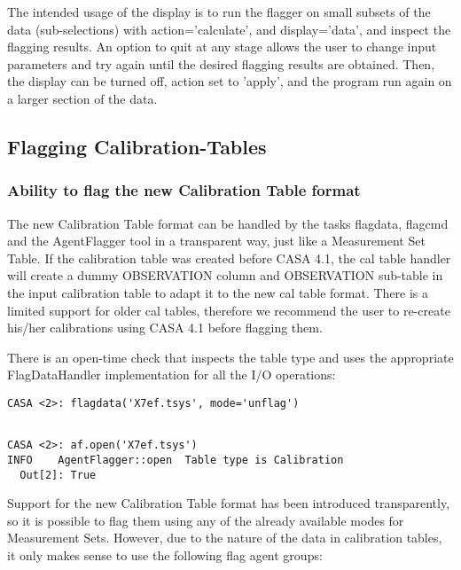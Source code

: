 The intended usage of the display is to run the flagger on small subsets of the data (sub-selections)
with action='calculate', and display='data', and inspect the flagging results. 
An option to quit at any stage allows the user to change input parameters and try again until the
desired flagging results are obtained.  Then, the display can be turned off,
action set to 'apply', and the program run again on a larger section of the
data.


\subsection{Flagging Calibration-Tables}

\subsubsection{Ability to flag the new Calibration Table format}

The new Calibration Table format can be handled by the tasks flagdata, flagcmd and the
AgentFlagger tool in a
transparent way, just like a Measurement Set Table. If the calibration table was created before
CASA 4.1, the cal table handler will create a dummy OBSERVATION column and OBSERVATION
sub-table in the input calibration table to adapt it to the new cal table format. There is
a limited support for older cal tables, therefore we recommend the user to re-create his/her
calibrations using CASA 4.1 before flagging them.

There is an open-time check that inspects the table type and uses the appropriate FlagDataHandler
implementation for all the I/O operations:


\begin{verbatim}
CASA <2>: flagdata('X7ef.tsys', mode='unflag')
\end{verbatim}

\begin{verbatim}

CASA <2>: af.open('X7ef.tsys')
INFO	AgentFlagger::open	Table type is Calibration
  Out[2]: True

\end{verbatim}

Support for the new Calibration Table format has been introduced
transparently, so it is possible to flag them using any of the already available
modes for Measurement Sets. However, due to the nature of the data in
calibration tables, it only makes sense to use the following flag agent groups:

